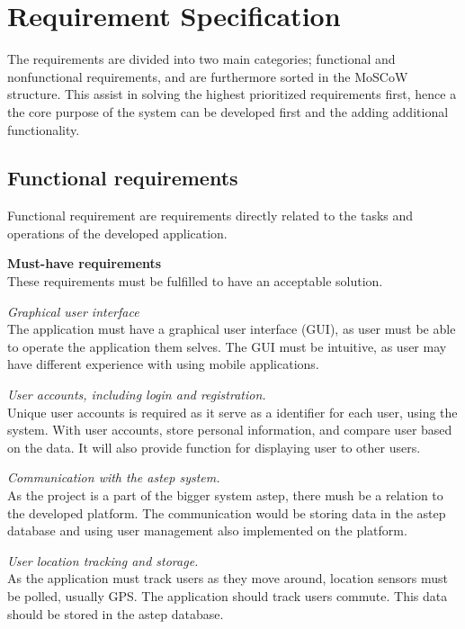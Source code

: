 \section{Requirement Specification}
The requirements are divided into two main categories; functional and nonfunctional requirements, and are furthermore sorted in the MoSCoW \cite{moscow} structure.
This assist in solving the highest prioritized requirements first, hence a the core purpose of the system can be developed first and the adding additional functionality.


\subsection{Functional requirements}
Functional requirement are requirements directly related to the tasks and operations of the developed application.

\textbf{Must-have requirements}\\
These requirements must be fulfilled to have an acceptable solution.

\textit{Graphical user interface}\\
The application must have a graphical user interface (GUI), as user must be able to operate the application them selves. 
The GUI must be intuitive, as user may have different experience with using mobile applications.

\textit{User accounts, including login and registration.}\\
Unique user accounts is required as it serve as a identifier for each user, using the system. With user accounts, store personal information, and compare user based on the data. 
It will also provide function for displaying user to other users.

\textit{Communication with the \gls{astep} system.}\\
As the project is a part of the bigger system \gls{astep}, there mush be a relation to the developed platform. 
The communication would be storing data in the \gls{astep} database and using user management also implemented on the platform.

\textit{User location tracking and storage.}\\
As the application must track users as they move around, location sensors must be polled, usually GPS. 
The application should track users commute.
This data should be stored in the \gls{astep} database.

